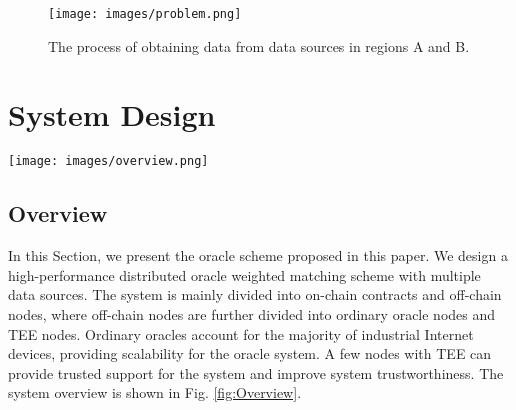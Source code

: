 \documentclass[paper]{ieice}
\begin{document}
\begin{figure}[h!]
    \centering
    \texttt{[image: images/problem.png]}
    \caption{The process of obtaining data from data sources in regions A and B.}
    \label{fig:problem}
\end{figure}




\section{System Design}
\label{work}

\begin{figure*}[h]
    \centering
    \texttt{[image: images/overview.png]}
    \caption{Overview of our oracle system.}
    \label{fig:Overview}
\end{figure*}

\subsection{Overview}
In this Section, we present the oracle scheme proposed in this paper. We design a high-performance distributed oracle weighted matching scheme with multiple data sources. The system is mainly divided into on-chain contracts and off-chain nodes, where off-chain nodes are further divided into ordinary oracle nodes and TEE nodes. Ordinary oracles account for the majority of industrial Internet devices, providing scalability for the oracle system. A few nodes with TEE can provide trusted support for the system and improve system trustworthiness. The system overview is shown in Fig. \ref {fig:Overview}.
\end{document}
